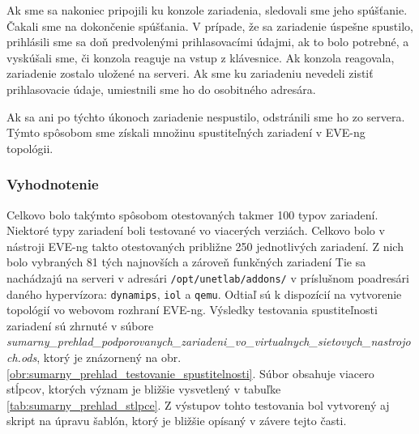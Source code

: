 Ak sme sa nakoniec pripojili ku konzole zariadenia, sledovali sme jeho spúšťanie. Čakali sme na dokončenie spúšťania. V prípade, že sa zariadenie úspešne spustilo, prihlásili sme sa doň predvolenými prihlasovacími údajmi, ak to bolo potrebné, a vyskúšali sme, či konzola reaguje na vstup z klávesnice. Ak konzola reagovala, zariadenie zostalo uložené na serveri. Ak sme ku zariadeniu nevedeli zistiť prihlasovacie údaje, umiestnili sme ho do osobitného adresára.

Ak sa ani po týchto úkonoch zariadenie nespustilo, odstránili sme ho zo servera. Týmto spôsobom sme získali množinu spustiteľných zariadení v EVE-ng topológii.

\subsubsection{Vyhodnotenie}

Celkovo bolo takýmto spôsobom otestovaných takmer 100 typov zariadení. Niektoré typy zariadení boli testované vo viacerých verziách. Celkovo bolo v nástroji EVE-ng takto otestovaných približne 250 jednotlivých zariadení. Z nich bolo vybraných 81 tých najnovších a zároveň funkčných zariadení Tie sa nachádzajú na serveri v adresári \texttt{/opt/unetlab/addons/} v príslušnom poadresári daného hypervízora: \texttt{dynamips}, \texttt{iol} a \texttt{qemu}. Odtiaľ sú k dispozícií na vytvorenie topológií vo webovom rozhraní EVE-ng. Výsledky testovania spustiteľnosti zariadení sú zhrnuté v súbore \\ \emph{sumarny\_prehlad\_podporovanych\_zariadeni\_vo\_virtualnych\_sietovych\_nastrojoch.ods}, ktorý je znázornený na obr. \ref{obr:sumarny_prehlad_testovanie_spustitelnosti}. Súbor obsahuje viacero stĺpcov, ktorých význam je bližšie vysvetlený v tabuľke \ref{tab:sumarny_prehlad_stlpce}. Z výstupov tohto testovania bol vytvorený aj skript na úpravu šablón, ktorý je bližšie opísaný v závere tejto časti.


